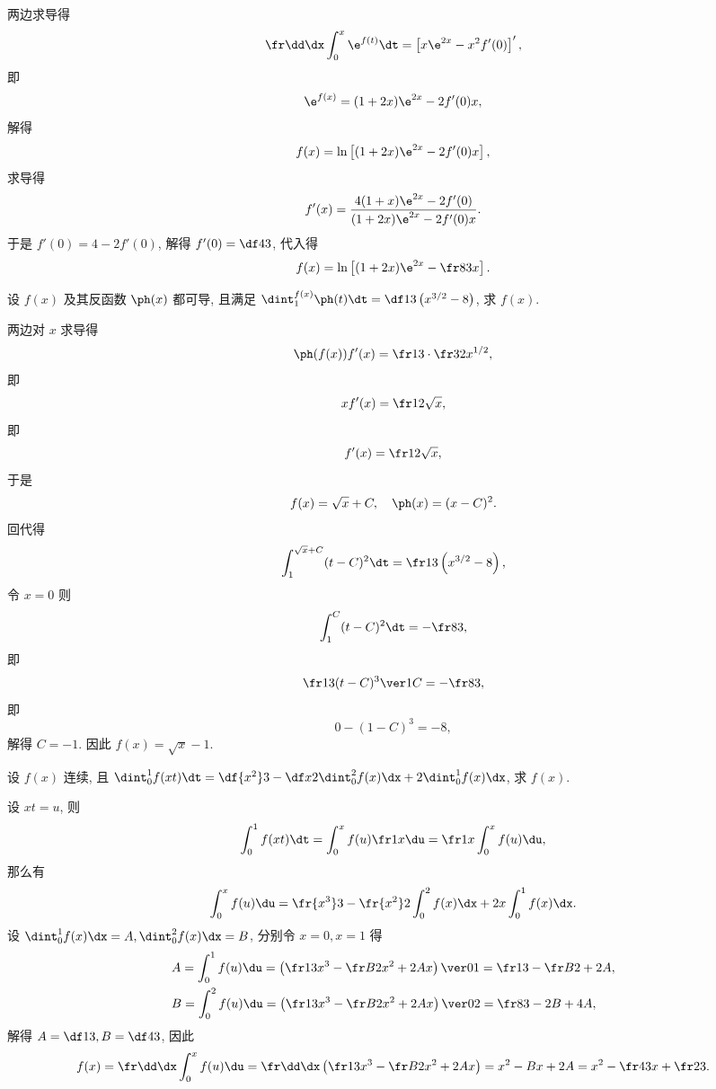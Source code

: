\documentclass{ctexart}
\begin{document}
\begin{solution}
    两边求导得 \[
        \fr\dd\dx\int_0^x\e^{f(t)}\dt=\left[x\e^{2x}-x^2f'(0)\right]',
    \] 即 \[
        \e^{f(x)}=(1+2x)\e^{2x}-2f'(0)x,
    \] 解得 \[
        f(x)=\ln\left[(1+2x)\e^{2x}-2f'(0)x\right],
    \] 求导得 \[
        f'(x)=\frac{4(1+x)\e^{2x}-2f'(0)}{(1+2x)\e^{2x}-2f'(0)x}.
    \] 于是 $f'(0)=4-2f'(0)$, 解得 $f'(0)=\df43$, 代入得 \[
        f(x)=\ln\left[(1+2x)\e^{2x}-\fr83x\right].
    \]
\end{solution}

\begin{exercise}
    设 $f(x)$ 及其反函数 $\ph(x)$ 都可导, 且满足 $\dint_1^{f(x)}\ph(t)\dt=\df13\left(x^{3/2}-8\right)$, 求 $f(x)$.
\end{exercise}

\begin{solution}
    两边对 $x$ 求导得 \[
        \ph(f(x))f'(x)=\fr13\cdot\fr32x^{1/2},
    \] 即 \[
        xf'(x)=\fr12\sqrt x,
    \] 即 \[
        f'(x)=\fr1{2\sqrt x},
    \] 于是 \[
        f(x)=\sqrt x+C,\quad\ph(x)=(x-C)^2.
    \] 回代得 \[
        \int_1^{\sqrt x+C}(t-C)^2\dt=\fr13\left(x^{3/2}-8\right),
    \] 令 $x=0$ 则 \[
        \int_1^C(t-C)^2\dt=-\fr83,
    \] 即 \[
        \fr13(t-C)^3\ver1C=-\fr83,
    \] 即 \[
        0-(1-C)^3=-8,
    \] 解得 $C=-1$. 因此 $f(x)=\sqrt x-1$.
\end{solution}

\begin{exercise}
    设 $f(x)$ 连续, 且 $\dint_0^1f(xt)\dt=\df{x^2}3-\df x2\dint_0^2f(x)\dx+2\dint_0^1f(x)\dx$, 求 $f(x)$.
\end{exercise}

\begin{solution}
    设 $xt=u$, 则 \[
        \int_0^1f(xt)\dt=\int_0^xf(u)\fr1x\du=\fr1x\int_0^xf(u)\du,
    \] 那么有 \[
        \int_0^xf(u)\du=\fr{x^3}3-\fr{x^2}2\int_0^2f(x)\dx+2x\int_0^1f(x)\dx.
    \] 设 $\dint_0^1f(x)\dx=A,\dint_0^2f(x)\dx=B$, 分别令 $x=0,x=1$ 得 \[\begin{aligned}
        &A=\int_0^1f(u)\du=\left(\fr13x^3-\fr B2x^2+2Ax\right)\ver01=\fr13-\fr B2+2A,\\
        &B=\int_0^2f(u)\du=\left(\fr13x^3-\fr B2x^2+2Ax\right)\ver02=\fr83-2B+4A,
    \end{aligned}\] 解得 $A=\df13,B=\df43$, 因此 \[
        f(x)=\fr\dd\dx\int_0^xf(u)\du=\fr\dd\dx\left(\fr13x^3-\fr B2x^2+2Ax\right)=x^2-Bx+2A=x^2-\fr43x+\fr23.
    \]
\end{solution}
\end{document}
